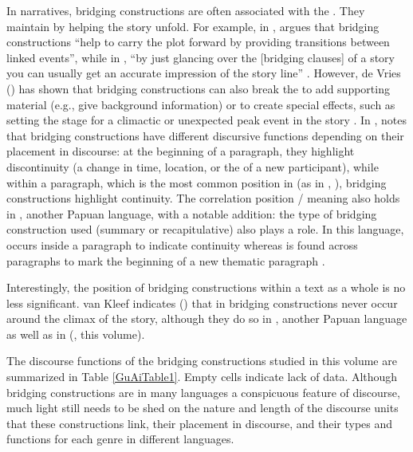 \documentclass[output=paper]{LSP/langsci}
\begin{document}
In narratives, bridging constructions are often associated with the . They maintain  by helping the story unfold. For example, in , \citet[][1324]{Jendraschek09} argues that bridging constructions ``help to carry the plot forward by providing transitions between linked events'', while in , ``by just glancing over the [bridging clauses] of a story you can usually get an accurate impression of the story line''  \citep[][153]{kleef88}.  However, de Vries (\citeyear{devries.2005, devries.2006}) has shown that bridging constructions can also break the  to add supporting material (e.g., give background information) or to create special effects, such as setting the stage for a climactic or unexpected peak event in the story  \citep[][373]{devries.2005}. In ,  \citet[][151--152]{kleef88} notes that bridging constructions have different discursive functions depending on their placement in discourse: at the beginning of a paragraph, they highlight discontinuity (a change in time, location, or the  of a new participant), while within a paragraph, which is the most common position in  (as in , \citealt[][123]{Guillaume2011}), bridging constructions highlight continuity. The correlation position / meaning also holds in , another Papuan language, with a notable addition: the type of bridging construction used (summary or recapitulative) also plays a role. In this language,  occurs inside a paragraph to indicate continuity whereas  is found across paragraphs to mark the beginning of a new thematic paragraph \citep[][23--30]{logan08}.

Interestingly, the position of bridging constructions within a text as a whole is no less significant. van Kleef indicates (\citeyear[][152]{kleef88}) that in  bridging constructions never occur around the climax of the story, although they do so in , another Papuan language as well as in  (\citeauthor{guerinchap18}, this volume). 

The discourse functions of the bridging constructions studied in this volume are summarized in Table \ref{GuAiTable1}. Empty cells indicate lack of data. Although bridging constructions are in many languages a conspicuous feature of discourse, much light still needs to be shed on the nature and length of the discourse units that these constructions link, their placement in discourse, and their types and functions for each genre in different languages.
\end{document}
